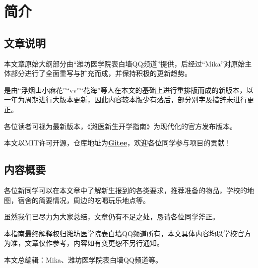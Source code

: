 \chapter[简介]{简介}
\section[文章说明]{文章说明}

本文章原始大纲部分由“潍坊医学院表白墙QQ频道”提供，后经过“Mika”对原始主体部分进行了全面重写与扩充而成，并保持积极的更新趋势。

\textbf{}是由“浮烟山小麻花”“vv”“花海”等人在本文的基础上进行重排版而成的新版本，以一年为周期进行大版本更新，因此内容较本版少有落后，部分别字及措辞未进行更正。

各位读者可视\textbf{}为最新版本，《潍医新生开学指南》为现代化的官方发布版本。

本文以MIT许可开源，仓库地址为\textbf{\href{https://gitee.com/mikazo/guide_for_freshman}{Gitee}}，欢迎各位同学参与项目的贡献！

\section[内容概要]{内容概要}

各位新同学可以在本文章中了解新生报到的各类要求，推荐准备的物品，学校的地图，宿舍的简要情况，周边的吃喝玩乐地点等。

虽然我们已尽力为大家总结，文章仍有不足之处，恳请各位同学斧正。

本指南最终解释权归潍坊医学院表白墙QQ频道所有，本文具体内容均以学校官方为准，文章仅作参考，内容如有变更恕不另行通知。

本文总编辑：Mika、潍坊医学院表白墙QQ频道等。